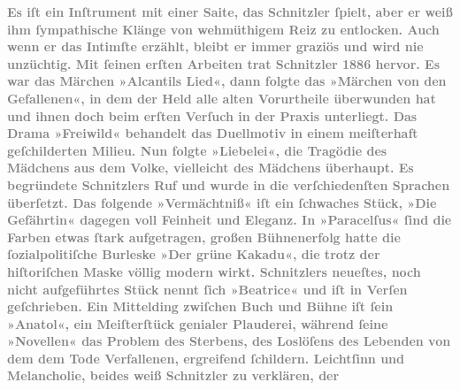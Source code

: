 \pstart
           \textcolor{gray}{\textbf{Es iſt ein Inſtrument mit einer Saite, das Schnitzler ſpielt,
                  aber er weiß ihm ſympathische Klänge von wehmüthigem Reiz zu entlocken. Auch wenn
                  er das Intimſte erzählt, bleibt er immer graziös und wird nie unzüchtig. Mit
                  ſeinen erſten Arbeiten trat Schnitzler 1886 hervor. Es
                  war das Märchen »Alcantils
                     Lied«, dann folgte das »Märchen von den Gefallenen«, in dem der Held alle alten Vorurtheile
                  überwunden hat und ihnen doch beim erſten Verſuch in der Praxis unterliegt. Das
                  Drama »Freiwild« behandelt das Duellmotiv in
                  einem meiſterhaft geſchilderten Milieu. Nun folgte »Liebelei«, die Tragödie des Mädchens aus dem Volke,
                  vielleicht des Mädchens überhaupt. Es begründete Schnitzlers Ruf und wurde in die
                  verſchiedenſten Sprachen überſetzt. Das folgende »Vermächtniß« iſt ein ſchwaches Stück, »Die Gefährtin« dagegen voll Feinheit und Eleganz. In »Paracelſus« ſind die Farben etwas ſtark aufgetragen,
                  großen Bühnenerfolg hatte die ſozialpolitiſche Burleske »Der grüne Kakadu«, die trotz der hiſtoriſchen Maske völlig
                  modern wirkt. Schnitzlers neueſtes, noch nicht aufgeführtes Stück nennt ſich »Beatrice« und iſt in Verſen geſchrieben. Ein
                  Mittelding zwiſchen Buch und Bühne iſt ſein »Anatol«, ein Meiſterſtück genialer Plauderei, während ſeine »Novellen« das Problem des
                  Sterbens, des Loslöſens des Lebenden von dem dem Tode Verfallenen, ergreifend
                  ſchildern. Leichtſinn und Melancholie, beides weiß Schnitzler zu verklären, der
}}
